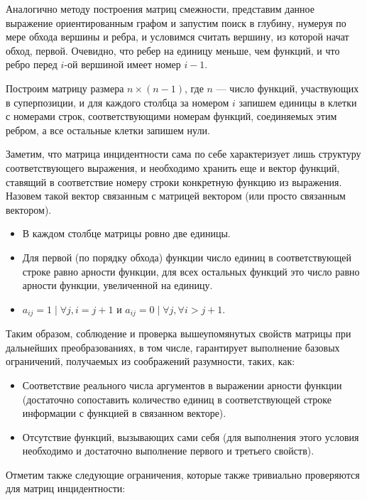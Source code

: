\documentclass[12pt,a4paper]{amsart}
\begin{document}
Аналогично методу построения матриц смежности, представим данное выражение ориентированным графом и запустим поиск в
глубину, нумеруя по мере обхода вершины и ребра, и условимся считать вершину, из которой начат обход, первой. Очевидно,
что ребер на единицу меньше, чем функций, и что ребро перед $i$-ой вершиной имеет номер $i - 1$.

Построим матрицу размера $n \times (n - 1)$, где $n$ --- число функций, участвующих в суперпозиции, и для каждого столбца
за номером $i$ запишем единицы в клетки с номерами строк, соответствующими номерам функций, соединяемых этим ребром, а
все остальные клетки запишем нули.

Заметим, что матрица инцидентности сама по себе характеризует лишь структуру соответствующего выражения, и необходимо
хранить еще и вектор функций, ставящий в соответствие номеру строки конкретную функцию из выражения. Назовем такой вектор
связанным с матрицей вектором (или просто связанным вектором).

\begin{itemize}
  \item \label{prop:inc_mat_two_ones} В каждом столбце матрицы ровно две единицы.
  \item \label{prop:inc_mat_row_ones} Для первой (по порядку обхода) функции число единиц в соответствующей строке равно
	арности функции, для всех остальных функций это число равно арности функции, увеличенной на единицу.
  \item \label{prop:inc_mat_struct} $ a_{ij} = 1 \mid \forall j, i = j + 1 $ и $ a_{ij} = 0 \mid \forall j, \forall i > j + 1 $.
\end{itemize}

Таким образом, соблюдение и проверка вышеупомянутых свойств матрицы при дальнейших преобразованиях, в том числе,
гарантирует выполнение базовых ограничений, получаемых из соображений разумности, таких, как:

\begin{itemize}
  \item Соответствие реального числа аргументов в выражении арности функции (достаточно сопоставить количество единиц
	в соответствующей строке информации с функцией в связанном векторе).
  \item Отсутствие функций, вызывающих сами себя (для выполнения этого условия необходимо и достаточно выполнение
	первого и третьего свойств).
\end{itemize}

Отметим также следующие ограничения, которые также тривиально проверяются для матриц инцидентности:
\end{document}
